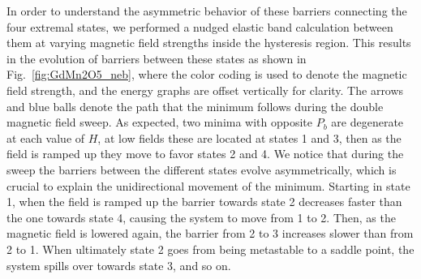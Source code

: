 \begin{figure*}[t]
    \centering
	\begin{subfigure}{\textwidth}
	\end{subfigure}
    \caption{\label{fig:GdMn2O5_neb}{\bf Energy barrier evolution.}
    Evolution of transition barriers between states 1, 2, 3, 4 as the magnetic field at 10$^\circ$ to the $a$-axis is swept through the hysteresis region. The plots are shifted vertically, and magnetodipolar interactions were enhanced by a factor of 5.3 for clarity. This latter increases the width of the hysteresis region. The curve colors encode the corresponding magnetic field strength. The blue circles and arrows show the trajectory of the energy minimum due to field sweeps.
    The red square and corresponding schematic on the right shows the asymmetric evolution of the barrier from state 2 to 1, and from 2 to 3 around the critical field $H^\ast$ where the barriers are of equal height. 
    Coordinated changes of the state energies and barrier asymmetry with magnetic field enable the topological behavior.
    }
\end{figure*}
In order to understand the asymmetric behavior of these barriers connecting the four extremal states, we performed a nudged elastic band calculation between them at varying magnetic field strengths inside the hysteresis region.
This results in the evolution of barriers between these states as shown in Fig.~\ref{fig:GdMn2O5_neb}, where the color coding is used to denote the magnetic field strength, and the energy graphs are offset vertically for clarity.
The arrows and blue balls denote the path that the minimum follows during the double magnetic field sweep. As expected, two minima with opposite $P_b$ are degenerate at each value of $H$, at low fields these are located at states 1 and 3, then as the field is ramped up they move to favor states 2 and 4.
We notice that during the sweep the barriers between the different states evolve asymmetrically, which is crucial to explain the unidirectional movement of the minimum.
Starting in state 1, when the field is ramped up the barrier towards state 2 decreases faster than the one towards state 4, causing the system to move from 1 to 2.
Then, as the magnetic field is lowered again, the barrier from 2 to 3 increases slower than from 2 to 1. When ultimately state 2 goes from being metastable to a saddle point, the system spills over towards state 3, and so on.
